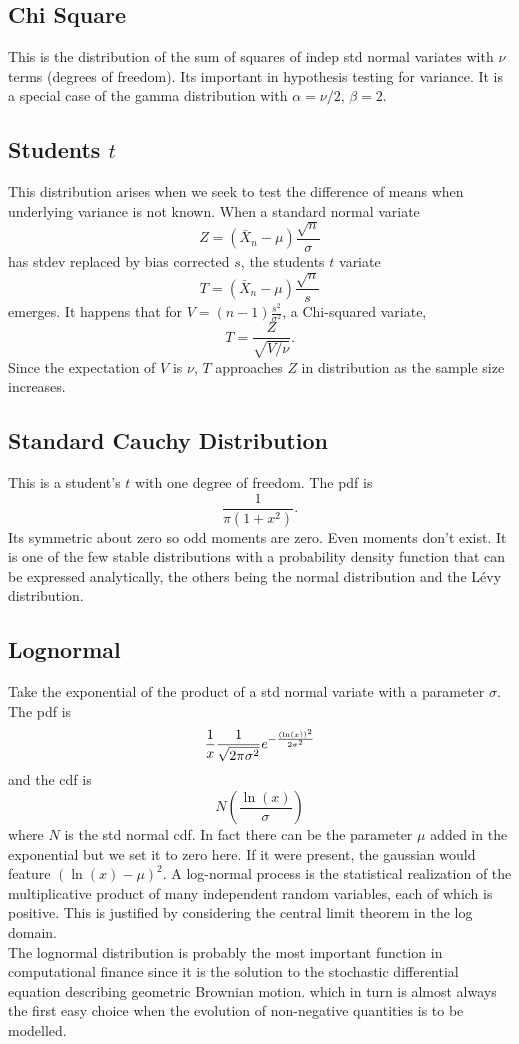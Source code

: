 \subsection{Chi Square}
This is the distribution of the sum of squares of indep std normal variates with $\nu$ terms (degrees of freedom). Its important
in hypothesis testing for variance. It is a special case of the gamma distribution with $\alpha = \nu \slash 2$, $\beta =2$.
\subsection{Students $t$}
This distribution arises when we seek to test the difference of
means when underlying variance is not known.
When a standard normal variate
$$
Z = (\bar{X}_n - \mu) \frac{\sqrt{n}}{\sigma}
$$
has stdev replaced by bias corrected $s$,
the students $t$ variate $$
T = (\bar{X}_n - \mu) \frac{\sqrt{n}}{s}
$$
emerges. It happens that for $V = (n-1)\frac{s^2}{\sigma^2}$, a Chi-squared variate, $$
T = \frac{Z}{\sqrt{V \slash \nu}}.
$$
Since the expectation of $V$ is $\nu$, $T$ approaches $Z$ in distribution as the sample size increases.
\subsection{Standard Cauchy Distribution}
This is a student's $t$ with one degree of freedom. The pdf is $$
\frac{1}{\pi(1+x^2)}.
$$
Its symmetric about zero so odd moments are zero. Even moments don't exist. It is one of the few stable distributions with a probability density function that can be expressed analytically, the others being the normal distribution and the Lévy distribution.
\subsection{Lognormal}
Take the exponential of the product of a std normal variate with a parameter $\sigma$.
The pdf is $$\frac{1}{x}\frac{1}{\sqrt{2\pi\sigma^2}} e^{-\frac{\left(\ln(x)\right)^2}{2\sigma^2}}$$ and the cdf is $$
N(\frac{\ln(x)}{\sigma})
$$
where $N$ is the std normal cdf. In fact there can be the parameter $\mu$ added in the exponential but we set it to zero here. If it were present, the gaussian would feature $(\ln(x)-\mu)^2$. A log-normal process is the statistical realization of the multiplicative product of many independent random variables, each of which is positive. This is justified by considering the central limit theorem in
the log domain. \\ \newline
The lognormal distribution is probably the most important function in computational
finance since it is the solution to the stochastic differential equation describing geometric
Brownian motion. which in turn is almost always the first easy choice when the evolution
of non-negative quantities is to be modelled.
